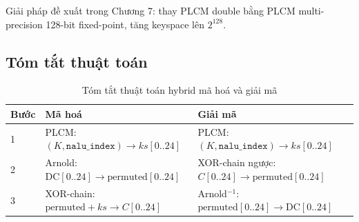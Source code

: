 Giải pháp đề xuất trong Chương 7: thay PLCM double bằng PLCM multi-precision
128-bit fixed-point, tăng keyspace lên $2^{128}$.

\subsection{Tóm tắt thuật toán}

\begin{table}[ht]
\centering
\caption{Tóm tắt thuật toán hybrid mã hoá và giải mã}
\label{tab:algo_summary}
\begin{tabular}{lll}
\toprule
Bước & Mã hoá & Giải mã \\
\midrule
1 & PLCM: $(K, \texttt{nalu\_index}) \to ks[0..24]$ & PLCM: $(K, \texttt{nalu\_index}) \to ks[0..24]$ \\
2 & Arnold: $\text{DC}[0..24] \to \text{permuted}[0..24]$ & XOR-chain ngược: $C[0..24] \to \text{permuted}[0..24]$ \\
3 & XOR-chain: $\text{permuted} + ks \to C[0..24]$ & Arnold$^{-1}$: $\text{permuted}[0..24] \to \text{DC}[0..24]$ \\
\bottomrule
\end{tabular}
\end{table}
